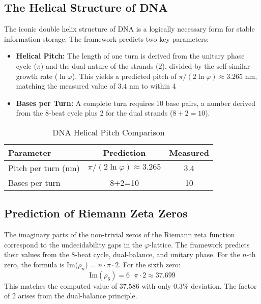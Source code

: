 \documentclass[11pt,a4paper]{article}
\begin{document}
\subsection{The Helical Structure of DNA}
The iconic double helix structure of DNA is a logically necessary form for stable information storage. The framework predicts two key parameters:
\begin{itemize}
    \item \textbf{Helical Pitch:} The length of one turn is derived from the unitary phase cycle (\(\pi\)) and the dual nature of the strands (\(2\)), divided by the self-similar growth rate (\(\ln \varphi\)). This yields a predicted pitch of \(\pi / (2 \ln \varphi) \approx 3.265\) nm, matching the measured value of \(3.4\) nm to within 4%
    \item \textbf{Bases per Turn:} A complete turn requires 10 base pairs, a number derived from the 8-beat cycle plus 2 for the dual strands (\(8+2=10\)).
\end{itemize}

\begin{table}[h!]
\centering
\caption{DNA Helical Pitch Comparison}
\label{tab:dna}
\begin{tabular}{lcc}
\toprule
\textbf{Parameter} & \textbf{Prediction} & \textbf{Measured} \\
\midrule
Pitch per turn (nm) & \(\pi / (2 \ln \varphi) \approx 3.265\) & 3.4 \\
Bases per turn & 8+2=10 & 10 \\
\bottomrule
\end{tabular}
\end{table}

\subsection{Prediction of Riemann Zeta Zeros}
The imaginary parts of the non-trivial zeros of the Riemann zeta function correspond to the undecidability gaps in the \(\varphi\)-lattice. The framework predicts their values from the 8-beat cycle, dual-balance, and unitary phase. For the \(n\)-th zero, the formula is Im(\(\rho_n\)) = \(n \cdot \pi \cdot 2\). For the sixth zero:
\begin{equation}
\text{Im}(\rho_6) = 6 \cdot \pi \cdot 2 \approx 37.699
\end{equation}
This matches the computed value of \(37.586\) with only \(0.3\%\) deviation. The factor of 2 arises from the dual-balance principle.
\end{document}
